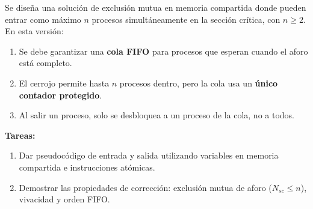 \documentclass[11pt,a4paper,twoside,openright]{report}
\begin{document}
\begin{ejercicio}
Se diseña una solución de exclusión mutua en memoria compartida donde pueden entrar como máximo $n$ procesos simultáneamente en la sección crítica, con $n \ge 2$.
En esta versión:
\begin{enumerate}
    \item Se debe garantizar una \textbf{cola FIFO} para procesos que esperan cuando el aforo está completo.
    \item El cerrojo permite hasta $n$ procesos dentro, pero la cola usa un \textbf{único contador protegido}.
    \item Al salir un proceso, solo se desbloquea a un proceso de la cola, no a todos.
\end{enumerate}
\textbf{Tareas:}
\begin{enumerate}[label=(\alph*)]
    \item Dar pseudocódigo de entrada y salida utilizando variables en memoria compartida e instrucciones atómicas.
    \item Demostrar las propiedades de corrección: exclusión mutua de aforo ($N_{sc} \le n$), vivacidad y orden FIFO.
\end{enumerate}
\end{ejercicio}
\end{document}
